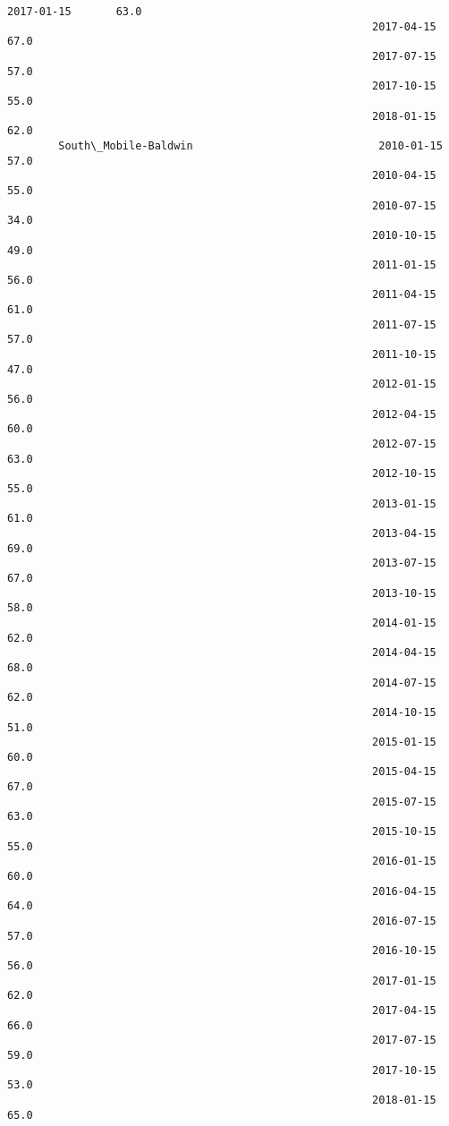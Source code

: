 \documentclass[11pt]{article}
\begin{document}
\begin{Verbatim}[commandchars=\\\{\}]
                                                         2017-01-15       63.0   
                                                         2017-04-15       67.0   
                                                         2017-07-15       57.0   
                                                         2017-10-15       55.0   
                                                         2018-01-15       62.0   
        South\_Mobile-Baldwin                             2010-01-15       57.0   
                                                         2010-04-15       55.0   
                                                         2010-07-15       34.0   
                                                         2010-10-15       49.0   
                                                         2011-01-15       56.0   
                                                         2011-04-15       61.0   
                                                         2011-07-15       57.0   
                                                         2011-10-15       47.0   
                                                         2012-01-15       56.0   
                                                         2012-04-15       60.0   
                                                         2012-07-15       63.0   
                                                         2012-10-15       55.0   
                                                         2013-01-15       61.0   
                                                         2013-04-15       69.0   
                                                         2013-07-15       67.0   
                                                         2013-10-15       58.0   
                                                         2014-01-15       62.0   
                                                         2014-04-15       68.0   
                                                         2014-07-15       62.0   
                                                         2014-10-15       51.0   
                                                         2015-01-15       60.0   
                                                         2015-04-15       67.0   
                                                         2015-07-15       63.0   
                                                         2015-10-15       55.0   
                                                         2016-01-15       60.0   
                                                         2016-04-15       64.0   
                                                         2016-07-15       57.0   
                                                         2016-10-15       56.0   
                                                         2017-01-15       62.0   
                                                         2017-04-15       66.0   
                                                         2017-07-15       59.0   
                                                         2017-10-15       53.0   
                                                         2018-01-15       65.0   
        

\end{Verbatim}
\end{document}
